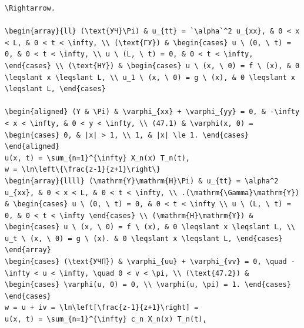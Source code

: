 \documentclass[
  ukrainian,
]{article}
\begin{document}
\begin{verbatim}
\Rightarrow.

\begin{array}{ll} (\text{УЧ}\Pi) & u_{tt} = `\alpha`^2 u_{xx}, & 0 < x < L, & 0 < t < \infty, \\ (\text{ГУ}) & \begin{cases} u \ (0, \ t) = 0, & 0 < t < \infty, \\ u \ (L, \ t) = 0, & 0 < t < \infty, \end{cases} \\ (\text{HY}) & \begin{cases} u \ (x, \ 0) = f \ (x), & 0 \leqslant x \leqslant L, \\ u_1 \ (x, \ 0) = g \ (x), & 0 \leqslant x \leqslant L, \end{cases}

\begin{aligned} (Y & \Pi) & \varphi_{xx} + \varphi_{yy} = 0, & -\infty < x < \infty, & 0 < y < \infty, \\ (47.1) & \varphi(x, 0) = \begin{cases} 0, & |x| > 1, \\ 1, & |x| \le 1. \end{cases} \end{aligned}
u(x, t) = \sum_{n=1}^{\infty} X_n(x) T_n(t),
w = \ln\left\{\frac{z-1}{z+1}\right\}
\begin{array}{llll} (\mathrm{Y}\mathrm{H}\Pi) & u_{tt} = \alpha^2 u_{xx}, & 0 < x < L, & 0 < t < \infty, \\ .(\mathrm{\Gamma}\mathrm{Y}) & \begin{cases} u \ (0, \ t) = 0, & 0 < t < \infty \\ u \ (L, \ t) = 0, & 0 < t < \infty \end{cases} \\ (\mathrm{H}\mathrm{Y}) & \begin{cases} u \ (x, \ 0) = f \ (x), & 0 \leqslant x \leqslant L, \\ u_t \ (x, \ 0) = g \ (x). & 0 \leqslant x \leqslant L, \end{cases} \end{array}
\begin{cases} (\text{УЧП}) & \varphi_{uu} + \varphi_{vv} = 0, \quad -\infty < u < \infty, \quad 0 < v < \pi, \\ (\text{47.2}) & \begin{cases} \varphi(u, 0) = 0, \\ \varphi(u, \pi) = 1. \end{cases} \end{cases}
w = u + iv = \ln\left[\frac{z-1}{z+1}\right] =
u(x, t) = \sum_{n=1}^{\infty} c_n X_n(x) T_n(t),
\end{verbatim}
\end{document}

